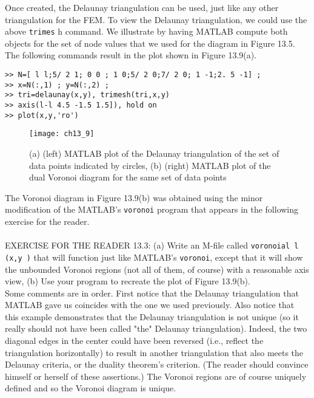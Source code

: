 \documentclass[../main.tex]{subfiles}
\begin{document}
Once created, the Delaunay triangulation can be used, just like any other triangulation for the FEM. To view the Delaunay triangulation, we could use the above \texttt{trimes} h command. We illustrate by having MATLAB compute both objects for the set of node values that we used for the diagram in Figure 13.5. The following commands result in the plot shown in Figure 13.9(a). 

\begin{lstlisting}[numbers=none,frame=none]
>> N=[ l l;5/ 2 1; 0 0 ; 1 0;5/ 2 0;7/ 2 0; 1 -1;2. 5 -1] ; 
>> x=N(:,1) ; y=N(:,2) ; 
>> tri=delaunay(x,y), trimesh(tri,x,y) 
>> axis(l-l 4.5 -1.5 1.5]), hold on 
>> plot(x,y,'ro')
\end{lstlisting}

\begin{figure}[H]
	\centering
	\texttt{[image: ch13\_9]}
	\caption{\textsf{(a) (left) MATLAB plot of the Delaunay triangulation of the set of data points indicated by circles, (b) (right) MATLAB plot of the dual Voronoi diagram for the same set of data points }}
	\label{pfig:ch13_9}
\end{figure}

The Voronoi diagram in Figure 13.9(b) was obtained using the minor modification of the MATLAB's \texttt{voronoi} program that appears in the following exercise for the reader.
\\
\\
EXERCISE FOR THE READER 13.3: (a) Write an M-file called \texttt{voronoial l (x,y )} that will function just like MATLAB's \texttt{voronoi}, except that it will show the unbounded Voronoi regions (not all of them, of course) with a reasonable axis view, (b) Use your program to recreate the plot of Figure 13.9(b).
\\

Some comments are in order. First notice that the Delaunay triangulation that MATLAB gave us coincides with the one we used previously. Also notice that this example demonstrates that the Delaunay triangulation is not unique (so it really should not have been called "the" Delaunay triangulation). Indeed, the two diagonal edges in the center could have been reversed (i.e., reflect the triangulation horizontally) to result in another triangulation that also meets the Delaunay criteria, or the duality theorem's criterion. (The reader should convince himself or herself of these assertions.) The Voronoi regions are of course uniquely defined and so the Voronoi diagram is unique. 
\\
\end{document}
